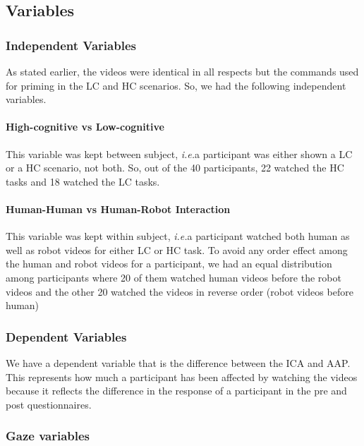 \documentclass[a4,twocolumn,10pt]{article}
\newcommand{\ie}{{\textit{i.e.\xspace}}}
\begin{document}
\subsection{Variables}

\subsubsection{Independent Variables}

As stated earlier, the videos were identical in all respects but the commands
used for priming in the LC and HC scenarios. So, we had the following
independent variables.

\paragraph{High-cognitive vs Low-cognitive}

This variable was kept between subject, \ie a participant was either shown a
LC or a HC scenario, not both. So, out of the 40 participants, 22 watched the HC
tasks and 18 watched the LC tasks.

\paragraph{Human-Human vs Human-Robot Interaction}

This variable was kept within subject, \ie a participant watched both
human as well as robot videos for either LC or HC task. To avoid any order
effect among the human and robot videos for a participant, we had an equal
distribution among participants where 20 of them watched human videos before the
robot videos and the other 20 watched the videos in reverse order (robot videos
before human) 

\subsubsection{Dependent Variables}

We have a dependent variable that is the difference between the ICA and AAP.
This represents how much a participant has been affected by watching the videos
because it reflects the difference in the response of a participant in the pre
and post questionnaires.

\subsubsection{Gaze variables}
\end{document}
